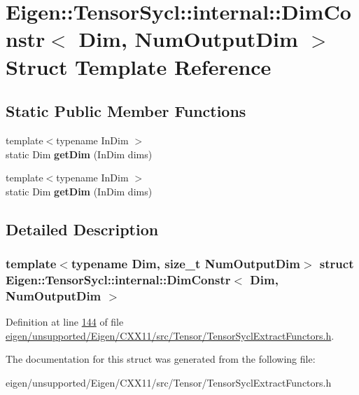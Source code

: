 \hypertarget{struct_eigen_1_1_tensor_sycl_1_1internal_1_1_dim_constr}{}\section{Eigen\+:\+:Tensor\+Sycl\+:\+:internal\+:\+:Dim\+Constr$<$ Dim, Num\+Output\+Dim $>$ Struct Template Reference}
\label{struct_eigen_1_1_tensor_sycl_1_1internal_1_1_dim_constr}
\subsection*{Static Public Member Functions}
\begin{DoxyCompactItemize}
\item 
\mbox{\label{struct_eigen_1_1_tensor_sycl_1_1internal_1_1_dim_constr_ab99835c92bb2033f55cb67b7eb39f49e}} 
{\footnotesize template$<$typename In\+Dim $>$ }\\static Dim {\bfseries get\+Dim} (In\+Dim dims)
\item 
\mbox{\label{struct_eigen_1_1_tensor_sycl_1_1internal_1_1_dim_constr_ab99835c92bb2033f55cb67b7eb39f49e}} 
{\footnotesize template$<$typename In\+Dim $>$ }\\static Dim {\bfseries get\+Dim} (In\+Dim dims)
\end{DoxyCompactItemize}


\subsection{Detailed Description}
\subsubsection*{template$<$typename Dim, size\+\_\+t Num\+Output\+Dim$>$\newline
struct Eigen\+::\+Tensor\+Sycl\+::internal\+::\+Dim\+Constr$<$ Dim, Num\+Output\+Dim $>$}



Definition at line \hyperlink{eigen_2unsupported_2_eigen_2_c_x_x11_2src_2_tensor_2_tensor_sycl_extract_functors_8h_source_l00144}{144} of file \hyperlink{eigen_2unsupported_2_eigen_2_c_x_x11_2src_2_tensor_2_tensor_sycl_extract_functors_8h_source}{eigen/unsupported/\+Eigen/\+C\+X\+X11/src/\+Tensor/\+Tensor\+Sycl\+Extract\+Functors.\+h}.



The documentation for this struct was generated from the following file\+:\begin{DoxyCompactItemize}
\item 
eigen/unsupported/\+Eigen/\+C\+X\+X11/src/\+Tensor/\+Tensor\+Sycl\+Extract\+Functors.\+h\end{DoxyCompactItemize}
